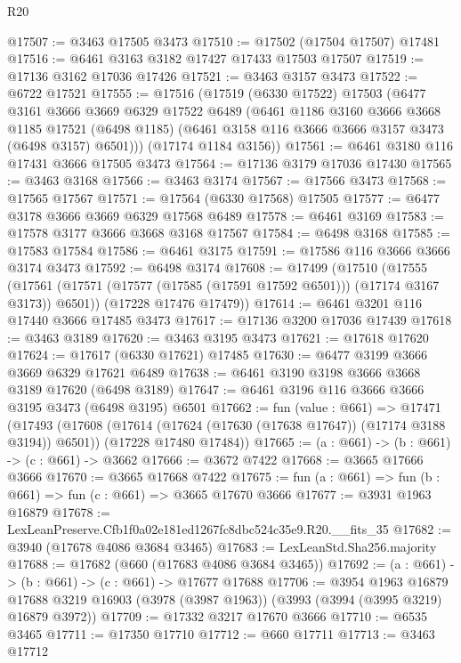 \begin{lexlean}{R20}
\begin{coremodule}
@17507 := @3463 @17505 @3473
@17510 := @17502 (@17504 @17507) @17481
@17516 := @6461 @3163 @3182 @17427 @17433 @17503 @17507
@17519 := @17136 @3162 @17036 @17426
@17521 := @3463 @3157 @3473
@17522 := @6722 @17521
@17555 := @17516
    (@17519
      (@6330 @17522)
      @17503
      (@6477
        @3161
        @3666
        @3669
        @6329
        @17522
        @6489
        (@6461
          @1186
          @3160
          @3666
          @3668
          @1185
          @17521
          (@6498 @1185)
          (@6461 @3158 @116 @3666 @3666 @3157 @3473 (@6498 @3157) @6501)))
      (@17174 @1184 @3156))
@17561 := @6461 @3180 @116 @17431 @3666 @17505 @3473
@17564 := @17136 @3179 @17036 @17430
@17565 := @3463 @3168
@17566 := @3463 @3174
@17567 := @17566 @3473
@17568 := @17565 @17567
@17571 := @17564 (@6330 @17568) @17505
@17577 := @6477 @3178 @3666 @3669 @6329 @17568 @6489
@17578 := @6461 @3169
@17583 := @17578 @3177 @3666 @3668 @3168 @17567
@17584 := @6498 @3168
@17585 := @17583 @17584
@17586 := @6461 @3175
@17591 := @17586 @116 @3666 @3666 @3174 @3473
@17592 := @6498 @3174
@17608 := @17499
    (@17510
      (@17555 (@17561 (@17571 (@17577 (@17585 (@17591 @17592 @6501))) (@17174 @3167 @3173)) @6501))
      (@17228 @17476 @17479))
@17614 := @6461 @3201 @116 @17440 @3666 @17485 @3473
@17617 := @17136 @3200 @17036 @17439
@17618 := @3463 @3189
@17620 := @3463 @3195 @3473
@17621 := @17618 @17620
@17624 := @17617 (@6330 @17621) @17485
@17630 := @6477 @3199 @3666 @3669 @6329 @17621 @6489
@17638 := @6461 @3190 @3198 @3666 @3668 @3189 @17620 (@6498 @3189)
@17647 := @6461 @3196 @116 @3666 @3666 @3195 @3473 (@6498 @3195) @6501
@17662 := fun (value : @661) =>
  @17471
    (@17493
      (@17608 (@17614 (@17624 (@17630 (@17638 @17647)) (@17174 @3188 @3194)) @6501))
      (@17228 @17480 @17484))
@17665 := (a : @661) -> (b : @661) -> (c : @661) -> @3662
@17666 := @3672 @7422
@17668 := @3665 @17666 @3666
@17670 := @3665 @17668 @7422
@17675 := fun (a : @661) => fun (b : @661) => fun (c : @661) => @3665 @17670 @3666
@17677 := @3931 @1963 @16879
@17678 := LexLeanPreserve.Cfb1f0a02e181ed1267fc8dbc524c35e9.R20.__fits_35
@17682 := @3940 (@17678 @4086 @3684 @3465)
@17683 := LexLeanStd.Sha256.majority
@17688 := @17682 (@660 (@17683 @4086 @3684 @3465))
@17692 := (a : @661) -> (b : @661) -> (c : @661) -> @17677 @17688
@17706 := @3954
    @1963
    @16879
    @17688
    @3219
    @16903
    (@3978 (@3987 @1963))
    (@3993 (@3994 (@3995 @3219) @16879 @3972))
@17709 := @17332 @3217 @17670 @3666
@17710 := @6535 @3465
@17711 := @17350 @17710
@17712 := @660 @17711
@17713 := @3463 @17712

\end{coremodule}
\end{lexlean}
